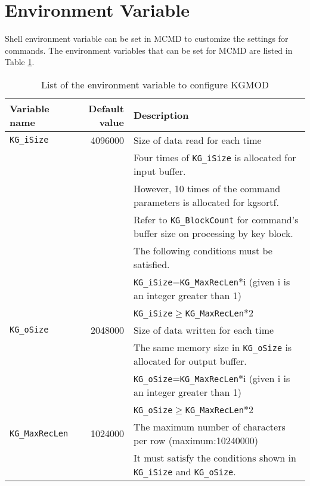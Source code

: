 %

\section{Environment Variable}
Shell environment variable can be set in MCMD to customize the settings for commands. The environment variables that can be set for MCMD are listed in Table \ref{tb:env}.

\begin{table}[htpb]
\begin{center}
\caption{List of the environment variable to configure KGMOD\label{tb:env}}
{\small
\begin{tabular}{l|r|l}
\hline
Variable name & Default value & Description\\ \hline
\verb|KG_iSize|          & 4096000 & Size of data read for each time \\
                         &         & Four times of \verb|KG_iSize| is allocated for input buffer.\\
                         &         & However, 10 times of the command parameters is allocated for kgsortf.\\
                         &         & Refer to \verb|KG_BlockCount| for command’s buffer size on processing by key block.\\
                         &         & The following conditions must be satisfied. \\
                         &         & \verb|KG_iSize|=\verb|KG_MaxRecLen|$*$i (given i is an integer greater than 1) \\
                         &         & \verb|KG_iSize|$\ge$\verb|KG_MaxRecLen|$*$2\\
\hline
\verb|KG_oSize|          & 2048000 & Size of data written for each time \\
                         &         & The same memory size in \verb|KG_oSize| is allocated for output buffer.\\
                         &         & \verb|KG_oSize|=\verb|KG_MaxRecLen|$*$i (given i is an integer greater than 1) \\
                         &         & \verb|KG_oSize|$\ge$\verb|KG_MaxRecLen|$*$2\\
\hline
\verb|KG_MaxRecLen|      & 1024000 & The maximum number of characters per row (maximum:10240000) \\
                         &         & It must satisfy the conditions shown in \verb|KG_iSize| and \verb|KG_oSize|.\\

\end{tabular}}
\end{center}
\end{table}
